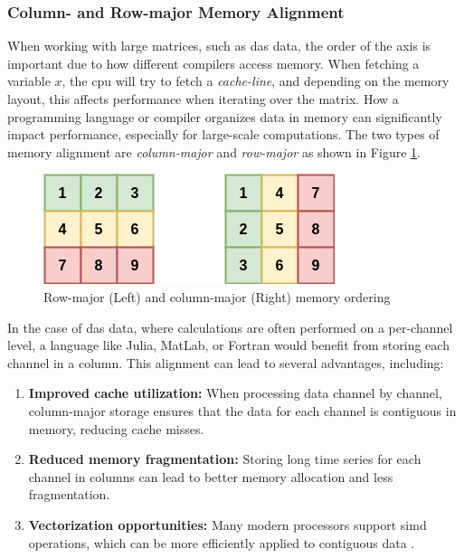 \subsubsection{Column- and Row-major Memory Alignment}
%
When working with large matrices, such as \acrshort{das} data, the order of the axis is important due to how different compilers access memory. When fetching a variable $x$, the \acrfull{cpu} will try to fetch a  \textit{cache-line}, and depending on the memory layout, this affects performance when iterating over the matrix. How a programming language or compiler organizes data in memory can significantly impact performance, especially for large-scale computations. The two types of memory alignment are \textit{column-major} and \textit{row-major} as shown in Figure \ref{fig:rowcol}.
%
\begin{figure}[!h]
    \centering
    \includegraphics[width=0.5\linewidth]{figures/rowcol.png}
    \caption{Row-major (Left) and column-major (Right) memory ordering}
    \label{fig:rowcol}
\end{figure}
%
In the case of \acrshort{das} data, where calculations are often performed on a per-channel level, a language like Julia, MatLab, or Fortran would benefit from storing each channel in a column. This alignment can lead to several advantages, including:
\begin{enumerate}
\item \textbf{Improved cache utilization:} When processing data channel by channel, column-major storage ensures that the data for each channel is contiguous in memory, reducing cache misses.
\item \textbf{Reduced memory fragmentation:} Storing long time series for each channel in columns can lead to better memory allocation and less fragmentation.
\item \textbf{Vectorization opportunities:} Many modern processors support \acrfull{simd} operations, which can be more efficiently applied to contiguous data \cite{ren2006optimizing}.
\end{enumerate}
%

